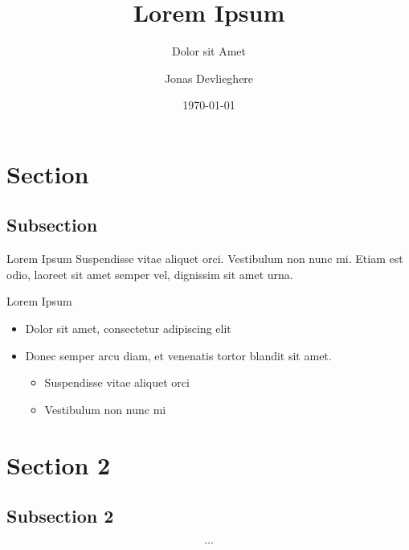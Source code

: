 \documentclass[12pt,t]{beamer}
\title{Lorem Ipsum}
\subtitle{Dolor sit Amet}
\author{Jonas Devlieghere}
\institute{Consectetur Adipiscing}
\date{\today}
\begin{document}
\frame{\titlepage} 

\section{Section}
\subsection{Subsection}
\begin{frame}
\begin{block}{Lorem Ipsum}
Suspendisse vitae aliquet orci. Vestibulum non nunc mi. Etiam est odio, laoreet sit amet semper vel, dignissim sit amet urna. 
\end{block}
\begin{block}{Lorem Ipsum}
\begin{itemize}
	\item Dolor sit amet, consectetur adipiscing elit
	\item Donec semper arcu diam, et venenatis tortor blandit sit amet.
	\begin{itemize}
		\item Suspendisse vitae aliquet orci
		\item Vestibulum non nunc mi
	\end{itemize}
\end{itemize}
\end{block}
\end{frame}

\section{Section 2}
\subsection{Subsection 2}
\begin{frame}
\[
\ldots
\]
\end{frame}
\end{document}
